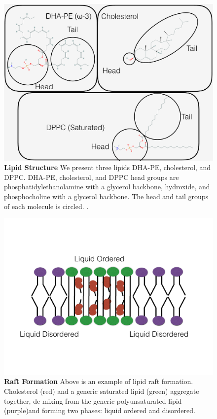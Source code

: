 \documentclass[10pt, letterpaper]{article}
\begin{document}
\begin{figure}[H]
   \centerline{\includegraphics[width=\textwidth,scale=0.55]{Lipid_struct.pdf}}
   \caption[Lipid Structure]{\textbf{Lipid Structure} We present three lipids DHA-PE, cholesterol, and DPPC. DHA-PE, cholesterol, and DPPC head groups are phosphatidylethanolamine with a glycerol backbone, hydroxide, and phosphocholine with a glycerol backbone. The head and tail groups of each molecule is circled. \cites{cholesterol}{dppc}{pe(22:6/22:6)}.
}\label{fig:chol}

\end{figure}
   \newpage

\begin{figure}[H]

   \centerline{\includegraphics[width=\textwidth,scale=0.5]{bilayCartoon.pdf}}
   \caption[Raft Formation]{\textbf{Raft Formation} Above is an example of lipid raft formation. Cholesterol (red) and a generic saturated lipid (green) aggregate together, de-mixing from the generic polyunsaturated lipid (purple)and forming two phases: liquid ordered and disordered.}\label{fig:clips}

\end{figure}
\newpage
\end{document}
